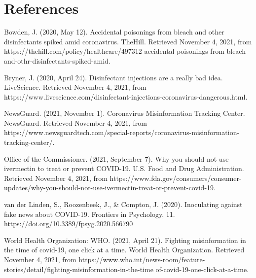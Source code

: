 \documentclass[fontsize=11pt]{article}
\begin{document}
    \section*{References}

    \begin{doublespace}
        \begin{hangparas}{0.25in}{1}
            Bowden, J. (2020, May 12). Accidental poisonings from bleach and other disinfectants spiked amid coronavirus. TheHill. Retrieved November 4, 2021, from https://thehill.com/policy/healthcare/497312-accidental-poisonings-from-bleach-and-othr-disinfectants-spiked-amid.

            Bryner, J. (2020, April 24). Disinfectant injections are a really bad idea. LiveScience. Retrieved November 4, 2021, from https://www.livescience.com/disinfectant-injections-coronavirus-dangerous.html.

            NewsGuard. (2021, November 1). Coronavirus Misinformation Tracking Center. NewsGuard. Retrieved November 4, 2021, from https://www.newsguardtech.com/special-reports/coronavirus-misinformation-tracking-center/.

            Office of the Commissioner. (2021, September 7). Why you should not use ivermectin to treat or prevent COVID-19. U.S. Food and Drug Administration. Retrieved November 4, 2021, from https://www.fda.gov/consumers/consumer-updates/why-you-should-not-use-ivermectin-treat-or-prevent-covid-19.

            van der Linden, S., Roozenbeek, J., \& Compton, J. (2020). Inoculating against fake news about COVID-19. Frontiers in Psychology, 11. https://doi.org/10.3389/fpsyg.2020.566790

            World Health Organization: WHO. (2021, April 21). Fighting misinformation in the time of covid-19, one click at a time. World Health Organization. Retrieved November 4, 2021, from https://www.who.int/news-room/feature-stories/detail/fighting-misinformation-in-the-time of-covid-19-one-click-at-a-time.

        \end{hangparas}
    \end{doublespace}



\end{document}
